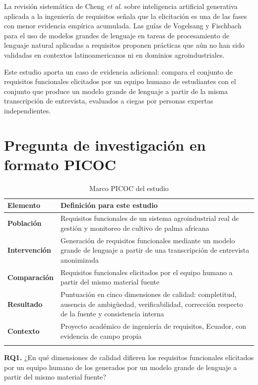 \documentclass[11pt,a4paper]{article}
\begin{document}
La revisión sistemática de Cheng \emph{et al.} sobre inteligencia artificial generativa aplicada a
la ingeniería de requisitos señala que la elicitación es una de las fases con menor evidencia
empírica acumulada. Las guías de Vogelsang y Fischbach para el uso de modelos grandes de lenguaje en
tareas de procesamiento de lenguaje natural aplicadas a requisitos proponen prácticas que aún no han
sido validadas en contextos latinoamericanos ni en dominios agroindustriales.

Este estudio aporta un caso de evidencia adicional: compara el conjunto de requisitos funcionales
elicitados por un equipo humano de estudiantes con el conjunto que produce un modelo grande de
lenguaje a partir de la misma transcripción de entrevista, evaluados a ciegas por personas expertas
independientes.

\section{Pregunta de investigación en formato PICOC}

\begin{longtable}{|C{2.6cm}|L{12.2cm}|}
\hline
{}\textbf{Elemento} & \textbf{Definición para este estudio} \\
\hline
\endhead
\textbf{Población} & Requisitos funcionales de un sistema agroindustrial real de gestión y monitoreo de cultivo de palma africana \\ \hline
\textbf{Intervención} & Generación de requisitos funcionales mediante un modelo grande de lenguaje a partir de una transcripción de entrevista anonimizada \\ \hline
\textbf{Comparación} & Requisitos funcionales elicitados por el equipo humano a partir del mismo material fuente \\ \hline
\textbf{Resultado} & Puntuación en cinco dimensiones de calidad: completitud, ausencia de ambigüedad, verificabilidad, corrección respecto de la fuente y consistencia interna \\ \hline
\textbf{Contexto} & Proyecto académico de ingeniería de requisitos, Ecuador, con evidencia de campo propia \\ \hline
\caption{Marco PICOC del estudio}
\end{longtable}

\noindent
\textbf{RQ1.} ¿En qué dimensiones de calidad difieren los requisitos funcionales elicitados por un
equipo humano de los generados por un modelo grande de lenguaje a partir del mismo material fuente?
\end{document}
